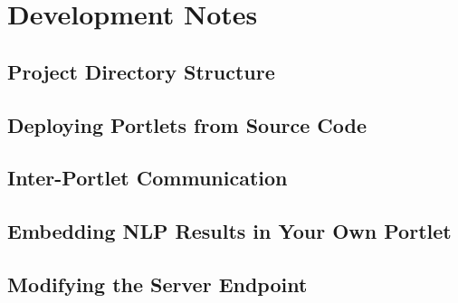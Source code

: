\section{Development Notes}
\subsection{Project Directory Structure}
\subsection{Deploying Portlets from Source Code}
\label{sec:src_deploy}
\subsection{Inter-Portlet Communication}
\subsection{Embedding NLP Results in Your Own Portlet}
\subsection{Modifying the \sa Server Endpoint}
\label{sec:server_change}